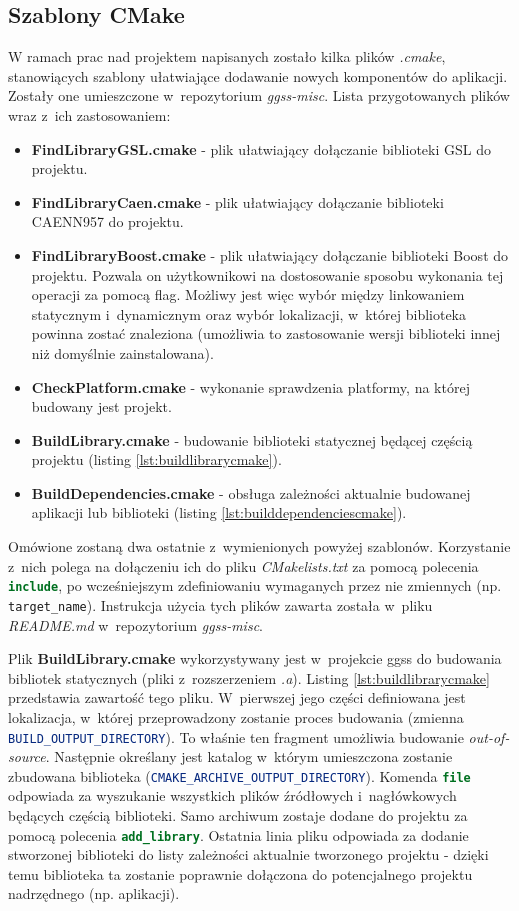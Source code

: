 \subsection{Szablony CMake}
W ramach prac nad projektem napisanych zostało kilka plików \textit{.cmake}, stanowiących szablony ułatwiające dodawanie nowych komponentów do aplikacji. Zostały one umieszczone w~repozytorium \textit{ggss-misc}. Lista przygotowanych plików wraz z~ich zastosowaniem:
\begin{itemize}
\item \textbf{FindLibraryGSL.cmake} - plik ułatwiający dołączanie biblioteki GSL do projektu.
\item \textbf{FindLibraryCaen.cmake} - plik ułatwiający dołączanie biblioteki CAENN957 do projektu.
\item \textbf{FindLibraryBoost.cmake} -  plik ułatwiający dołączanie biblioteki Boost do projektu. Pozwala on użytkownikowi na dostosowanie sposobu wykonania tej operacji za pomocą flag. Możliwy jest więc wybór między linkowaniem statycznym i~dynamicznym oraz wybór lokalizacji, w~której biblioteka powinna zostać znaleziona (umożliwia to zastosowanie wersji biblioteki innej niż domyślnie zainstalowana). 
\item \textbf{CheckPlatform.cmake} - wykonanie sprawdzenia platformy, na której budowany jest projekt.
\item \textbf{BuildLibrary.cmake} - budowanie biblioteki statycznej będącej częścią projektu (listing \ref{lst:buildlibrarycmake}).
\item \textbf{BuildDependencies.cmake} - obsługa zależności aktualnie budowanej aplikacji lub biblioteki (listing \ref{lst:builddependenciescmake}). 
\end{itemize}

Omówione zostaną dwa ostatnie z~wymienionych powyżej szablonów. Korzystanie z~nich polega na dołączeniu ich do pliku \textit{CMakelists.txt} za pomocą polecenia \lstinline[language=cmake]{include}, po wcześniejszym zdefiniowaniu wymaganych przez nie zmiennych (np. \lstinline{target_name}). Instrukcja użycia tych plików zawarta została w~pliku \textit{README.md} w~repozytorium \textit{ggss-misc}.

Plik \textbf{BuildLibrary.cmake} wykorzystywany jest w~projekcie \gls*{ggss} do budowania bibliotek statycznych (pliki z~rozszerzeniem \textit{.a}). Listing \ref{lst:buildlibrarycmake} przedstawia zawartość tego pliku. W~pierwszej jego części definiowana jest lokalizacja, w~której przeprowadzony zostanie proces budowania (zmienna \lstinline[language=cmake]{BUILD_OUTPUT_DIRECTORY}). To właśnie ten fragment umożliwia budowanie \textit{out-of-source}. Następnie określany jest katalog w~którym umieszczona zostanie zbudowana biblioteka (\lstinline[language=cmake]{CMAKE_ARCHIVE_OUTPUT_DIRECTORY}). Komenda \lstinline[language=cmake]{file} odpowiada za wyszukanie wszystkich plików źródłowych i~nagłówkowych będących częścią biblioteki. Samo archiwum zostaje dodane do projektu za pomocą polecenia \lstinline[language=cmake]{add_library}. Ostatnia linia pliku odpowiada za dodanie stworzonej biblioteki do listy zależności aktualnie tworzonego projektu - dzięki temu biblioteka ta zostanie poprawnie dołączona do potencjalnego projektu nadrzędnego (np. aplikacji).


